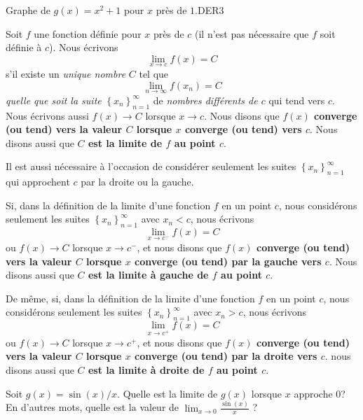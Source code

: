 {
{Graphe de $g(x) = x^2 + 1$ pour $x$ près de $1$.}{DER3}

\begin{focus}{\dfn} 
Soit $f$ une fonction définie pour $x$ près de $c$ (il n'est pas
nécessaire que $f$ soit définie à $c$).  Nous écrivons
\[
\lim_{x\rightarrow c} f(x) = C
\]
s'il existe un {\em unique nombre} $C$ tel que
\[
\lim_{n\rightarrow \infty} f(x_n) = C
\]
{\em quelle que soit la suite}
$\displaystyle \left\{x_n\right\}_{n=1}^\infty$ de
{\em nombres différents de $c$} qui tend vers $c$.   Nous écrivons aussi
$f(x) \to C$ lorsque $x \to c$.  Nous disons que
{\bfseries $f(x)$ converge (ou tend) vers la valeur $C$
lorsque $x$ converge (ou tend) vers $c$}.  Nous disons aussi que
{\bfseries $C$ est la limite de $f$ au point $c$}.
\label{def1_conv}
\end{focus}

Il est aussi nécessaire à l'occasion de considérer seulement les suites
$\displaystyle \left\{x_n\right\}_{n=1}^\infty$ qui approchent $c$ par la
droite ou la gauche.

\begin{focus}{\dfn}
Si, dans la définition de la limite d'une fonction $f$ en un point
$c$, nous considérons seulement les suites
$\displaystyle \left\{x_n\right\}_{n=1}^\infty$ avec {\em $x_n < c$}, nous
écrivons
\[
\lim_{x\rightarrow c^-} f(x) = C
\]
ou $f(x) \to C$ lorsque $x \to c^-$,
et nous disons que {\bfseries $f(x)$ converge (ou tend) vers la valeur $C$
lorsque $x$ converge (ou tend) par la gauche vers $c$}.  Nous disons aussi
que {\bfseries $C$ est la limite à gauche de $f$ au point $c$}.

De même, si, dans la définition de la limite d'une fonction $f$ en un
point $c$, nous considérons seulement les suites
$\displaystyle \left\{x_n\right\}_{n=1}^\infty$ avec {\em $x_n > c$}, nous
écrivons
\[
\lim_{x\rightarrow c^+} f(x) = C
\]
ou $f(x) \to C$ lorsque $x \to c^+$,
et nous disons que {\bfseries $f(x)$ converge (ou tend) vers la valeur $C$
lorsque $x$ converge (ou tend) par la droite vers $c$}.  nous disons aussi que
{\bfseries $C$ est la limite à droite de $f$ au point $c$}.
\end{focus}

\begin{egg}
Soit $g(x) = \sin(x)/x$. Quelle est la limite de $g(x)$ lorsque $x$
approche $0$?  En d'autres mots, quelle est la valeur de
$\displaystyle \lim_{x\rightarrow 0} \frac{\sin(x)}{x}$ ?


\end{egg}}
